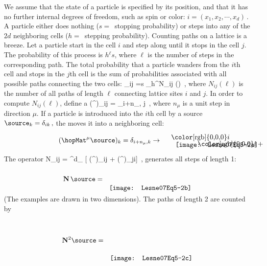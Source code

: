 \bigskip
\noindent
We assume that the state of a particle is specified by its position, and
that it has no further internal degrees of freedom, such as spin or color:
\(
i = (x_1,x_2,\cdots,x_d)
\,.
\)
A particle either does nothing ($s =$~stopping probability) or steps into any
of the \(2d\) neighboring cells ($h =$~stepping probability).
Counting paths on a lattice is a breeze.
Let a particle start in the cell \(i\) and step along until it stops in the
cell \(j\).
The probability of this process is \(h{}^\ell s\), where  \(\ell\) is the
number of steps in the corresponding path. The total probability that a
particle wanders from the $i$th cell and stops in the $j$th cell is the
sum of probabilities associated with all possible paths connecting the
two cells:
\beq
\Delta_{ij} =s \sum_\ell h^\ell N_{ij} (\ell)	
\,,
where $N_{ij}(\ell)$ is the number of all paths of length $\ell$
connecting lattice sites $i$ and $j$. In order to compute $N_{ij}(\ell)$,
define a {\stepOp}
\beq
(\hopMat^\mu)_{ij} = \delta_{i+n_\mu , j}
\,, 	
where \( n_\mu \) is a unit step in direction \( \mu \).
If a particle is introduced into the $i$th cell by a source
\(
\source_k = \delta_{ik}
\,,
\)
the {\stepOp} moves it into a neighboring cell:
\[
(\hopMat^\mu \source)_k=\delta_{i+n_\mu , k} \to
 ~~~~ \raisebox{-1.5ex}[3.5ex][2.5ex]{
  \setlength{\unitlength}{7ex} %
  \begin{picture}(1,0.47666132)%
    \put(0,0){\texttt{[image: Lesne07Eq5-2a]}}%
    \put(-0.20779928,0.36126749){\color[rgb]{0,0,0}\makebox(0,0)[lb]{\smash{$i$}}}%
    \put(1.08572459,0.03917364){\color[rgb]{0,0,0}\makebox(0,0)[lb]{\smash{$i+n_\mu$}}}%
  \end{picture}%
    }
%
\]
The operator
\beq
N_{ij} = \sum^d_{}
	 [ (\hopMat^\mu)_{ij} + (\hopMat^\mu)_{ji}]
	\,,
\label{(5.3)}
\eeq
generates all steps of length 1:
\[
 \mathbf{N}\, \source = ~~ \raisebox{-3.0ex}[4.5ex][3ex]
    {\texttt{[image: Lesne07Eq5-2b]}}
\]
(The examples are drawn in two dimensions). The paths of length
2 are counted by
\[
\mathbf{N}^2 \source = ~~ \raisebox{-6.0ex}[8.5ex][6.5ex]
    {\texttt{[image: Lesne07Eq5-2c]}}
\]
